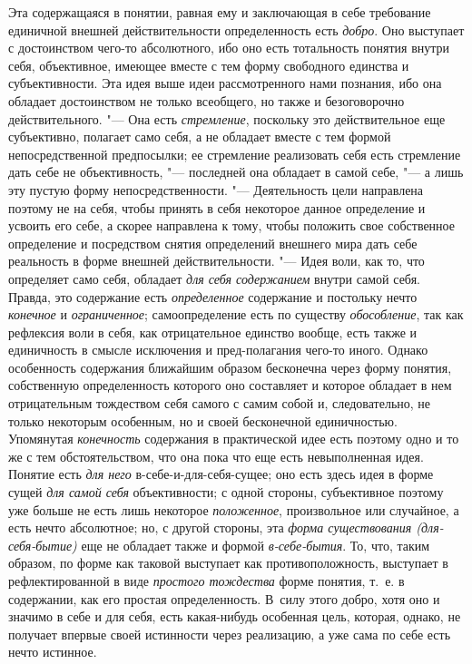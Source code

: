 {{Эта содержащаяся в понятии, равная ему и заключающая в себе
требование единичной внешней действительности определенность
есть {\em добро}.
Оно выступает с достоинством чего-то абсолютного, ибо оно
есть тотальность понятия внутри себя, объективное, имеющее вместе с тем
форму свободного единства и субъективности. Эта идея выше идеи
рассмотренного нами познания, ибо она обладает достоинством не только
всеобщего, но также и безоговорочно действительного. "--- Она
есть {\em стремление},
поскольку это действительное еще субъективно, полагает само
себя, а не обладает вместе с тем формой непосредственной предпосылки; ее
стремление реализовать себя есть стремление дать себе не объективность, "---
последней она обладает в самой себе, "--- а лишь
эту пустую форму непосредственности. "--- Деятельность цели
направлена поэтому не на себя, чтобы принять в себя некоторое данное
определение и усвоить его себе, а скорее направлена к тому, чтобы положить
свое собственное определение и посредством снятия определений внешнего мира
дать себе реальность в форме внешней действительности. "---
Идея воли, как то, что определяет само себя, обладает
{\em для себя содержанием}
внутри самой себя. Правда, это содержание есть
{\em определенное}
содержание и постольку нечто
{\em конечное} и
{\em ограниченное};
самоопределение есть по существу
{\em обособление}, так
как рефлексия воли в себя, как отрицательное единство вообще, есть также и
единичность в смысле исключения и пред-полагания чего-то
иного. Однако особенность содержания ближайшим образом бесконечна через
форму понятия, собственную определенность которого оно составляет и которое
обладает в нем отрицательным тождеством себя самого с самим собой и,
следовательно, не только некоторым особенным, но и своей бесконечной
единичностью. Упомянутая
{\em конечность}
содержания в практической идее есть поэтому одно и то же с
тем обстоятельством, что она пока что еще есть невыполненная идея. Понятие
есть {\em для него}
в-себе-и-для-себя-сущее; оно есть здесь идея в форме сущей
{\em для самой себя}
объективности; с одной стороны, субъективное поэтому уже
больше не есть лишь некоторое
{\em положенное},
произвольное или случайное, а есть нечто абсолютное; но, с
другой стороны, эта {\em форма
существования (для-себя-бытие)} еще не обладает также и
формой {\em в-себе-бытия}.
То, что, таким образом, по форме как таковой выступает как
противоположность, выступает в рефлектированной в виде
{\em простого тождества}
форме понятия, т.~е. в содержании, как его простая
определенность. В~силу этого добро, хотя оно и значимо в себе и для себя,
есть какая-нибудь особенная цель, которая, однако, не получает впервые
своей истинности через реализацию, а уже сама по себе есть нечто
истинное.

}}
